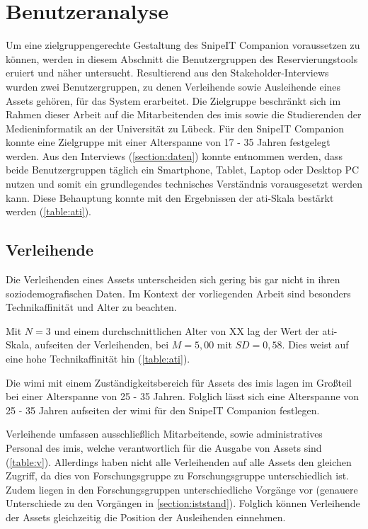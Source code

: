 \section{Benutzeranalyse}
\label{section:benutzer}
Um eine zielgruppengerechte Gestaltung des SnipeIT Companion voraussetzen zu können, werden in
diesem Abschnitt die Benutzergruppen des Reservierungstools eruiert und näher untersucht.
Resultierend aus den Stakeholder-Interviews wurden zwei Benutzergruppen, zu denen Verleihende sowie
Ausleihende eines Assets gehören, für das System erarbeitet. Die Zielgruppe beschränkt sich im
Rahmen dieser Arbeit auf die Mitarbeitenden des \ac{imis} sowie die Studierenden der
Medieninformatik an der Universität zu Lübeck. Für den SnipeIT Companion konnte eine Zielgruppe mit
einer Alterspanne von 17 - 35 Jahren festgelegt werden. Aus den Interviews (\ref{section:daten})
konnte entnommen werden, dass beide Benutzergruppen täglich ein Smartphone, Tablet, Laptop oder
Desktop PC nutzen und somit ein grundlegendes technisches Verständnis vorausgesetzt werden kann.
Diese Behauptung konnte mit den Ergebnissen der \ac{ati}-Skala bestärkt werden (\ref{table:ati}).


\subsection{Verleihende}
Die Verleihenden eines Assets unterscheiden sich gering bis gar nicht in ihren soziodemografischen
Daten. Im Kontext der vorliegenden Arbeit sind besonders Technikaffinität und Alter zu beachten.

Mit $N=3$ und einem durchschnittlichen Alter von XX lag der Wert der \ac{ati}-Skala, aufseiten der
Verleihenden, bei $M=5,00$ mit $SD=0,58$. Dies weist auf eine hohe Technikaffinität hin
(\ref{table:ati}).

Die \ac{wimi} mit einem Zuständigkeitsbereich für Assets des \ac{imis} lagen im Großteil bei einer
Alterspanne von 25 - 35 Jahren. Folglich lässt sich eine Alterspanne von 25 - 35 Jahren aufseiten
der \ac{wimi} für den SnipeIT Companion festlegen.

Verleihende umfassen ausschließlich Mitarbeitende, sowie administratives Personal des \ac{imis},
welche verantwortlich für die Ausgabe von Assets sind (\ref{table:v}). Allerdings haben nicht alle
Verleihenden auf alle Assets den gleichen Zugriff, da dies von Forschungsgruppe zu Forschungsgruppe
unterschiedlich ist. Zudem liegen in den Forschungsgruppen unterschiedliche Vorgänge vor (genauere
Unterschiede zu den Vorgängen in \ref{section:iststand}). Folglich können Verleihende der Assets
gleichzeitig die Position der Ausleihenden einnehmen.

